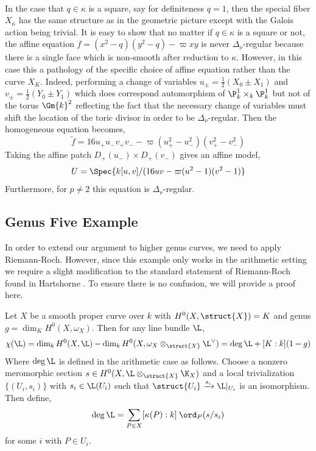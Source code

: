 \bigskip\\
In the case that $q \in \kappa$ is a square, say for definiteness $q = 1$, then the special fiber $X_\kappa$ has the same structure as in the geometric picture except with the Galois action being trivial. It is easy to show that no matter if $q \in \kappa$ is a square or not, the affine equation $f = (x^2 - q)(y^2 - q) - \varpi xy$ is never $\Delta_\nu$-regular because there is a single face which is non-smooth after reduction to $\kappa$. However, in this case this a pathology of the specific choice of affine equation rather than the curve $X_K$. Indeed, performing a change of variables $u_{\pm} = \tfrac{1}{2}(X_0 \pm X_1)$ and $v_{\pm} = \tfrac{1}{2}(Y_0 \pm Y_1)$ which does correspond automorphism of $\P^1_k \times_k \P^1_k$ but not of the torus $\Gm{k}^2$ reflecting the fact that the necessary change of variables must shift the location of the toric divisor in order to be $\Delta_\nu$-regular. Then the homogeneous equation becomes, 
\[ \tilde{f} = 16 u_+ u_{-} v_{+} v_{-} - \varpi (u_{+}^2 - u_{-}^2) (v_{+}^2 - v_{-}^2) \]
Taking the affine patch $D_{+}(u_{-}) \times D_+(v_{-})$ gives an affine model,
\[ U = \Spec{k[u,v]/(16 uv - \varpi (u^2 - 1)(v^2 - 1)} \]
Furthermore, for $p \neq 2$ this equation is $\Delta_\nu$-regular. 


\subsection{Genus Five Example}


In order to extend our argument to higher genus curves, we need to apply Riemann-Roch. However, since this example only works in the arithmetic setting we require a slight modification to the standard statement of Riemann-Roch found in Hartshorne \cite[Thm. IV.1.3]{har}. To ensure there is no confusion, we will provide a proof here.

\begin{theorem}
Let $X$ be a smooth proper curve over $k$ with $H^0(X, \struct{X}) = K$ and genus $g = \dim_K H^0(X, \omega_X)$. Then for any line bundle $\L$,
\[ \chi(\L) = \dim_k H^0(X, \L) - \dim_k H^0(X, \omega_X \otimes_{\struct{X}} \L^\vee) = \deg{\L} + [ K : k ] (1 - g) \]
Where $\deg{\L}$ is defined in the arithmetic case as follows. Choose a nonzero meromorphic section $s \in H^0(X, \L \otimes_{\struct{X}} \K_X)$ and a local trivialization $\{ (U_i, s_i) \}$ with $s_i \in \L(U_i)$ such that $\struct{U_i} \xrightarrow{s_i} \L|_{U_i}$ is an isomorphism. Then define,
\[ \deg{\L} = \sum_{P \in X} [\kappa(P) : k] \: \ord_{P}(s/s_i) \] 
for some $i$ with $P \in U_i$. 
\end{theorem}

